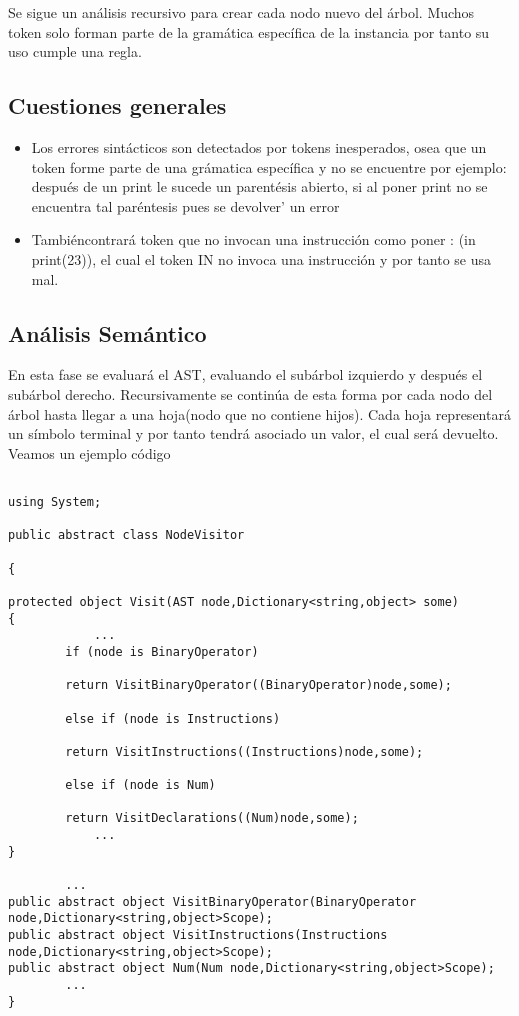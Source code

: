 \documentclass[a4paper,12pt]{article}
\begin{document}
Se sigue un an\'alisis recursivo para crear cada nodo nuevo del \'arbol. Muchos token solo forman parte de la gram\'atica espec\'ifica de la instancia por tanto su uso cumple una regla.

\subsection*{Cuestiones generales}
\begin{itemize}
    \item Los errores sint\'acticos son detectados por tokens inesperados, osea que un token forme parte de una gr\'amatica espec\'ifica y no se encuentre por ejemplo: despu\'es de un print le sucede un parent\'esis abierto, si al poner print no se encuentra tal par\'entesis pues se devolver\a' un error
    \item Tambi\'encontrar\'a token que no invocan una instrucci\'on como poner : (in print(23)), el cual el token IN no invoca una instrucci\'on y por tanto se usa mal.
\end{itemize}

\subsection{An\'alisis Sem\'antico }

En esta fase se evaluar\'a el AST, evaluando el sub\'arbol izquierdo y despu\'es el sub\'arbol derecho. Recursivamente se contin\'ua de esta forma por cada nodo del \'arbol hasta llegar a una hoja(nodo que no contiene hijos). Cada hoja representar\'a un s\'imbolo terminal y por tanto tendr\'a asociado un valor, el cual ser\'a devuelto. Veamos un ejemplo c\'odigo

\begin{lstlisting}[style=csharp]

using System;

public abstract class NodeVisitor 

{
    
protected object Visit(AST node,Dictionary<string,object> some)
{
            ...
        if (node is BinaryOperator)

        return VisitBinaryOperator((BinaryOperator)node,some);
            
        else if (node is Instructions)

        return VisitInstructions((Instructions)node,some);
    
        else if (node is Num)
    
        return VisitDeclarations((Num)node,some);
            ...
}

        ...
public abstract object VisitBinaryOperator(BinaryOperator node,Dictionary<string,object>Scope);
public abstract object VisitInstructions(Instructions node,Dictionary<string,object>Scope);
public abstract object Num(Num node,Dictionary<string,object>Scope);
        ...
}

\end{lstlisting}
\end{document}
